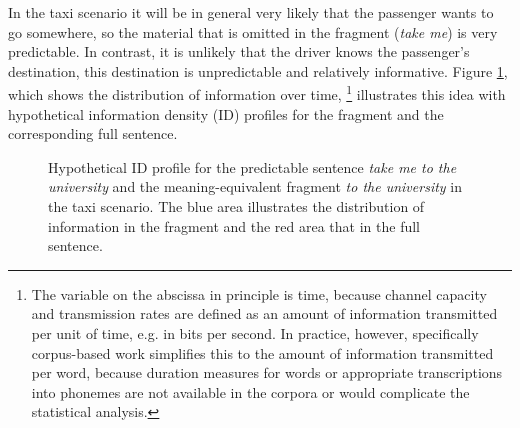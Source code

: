 In the taxi scenario it will be in general very likely that the passenger wants to go somewhere, so the material that is omitted in the fragment (\textit{take me}) is very predictable. In contrast, it is unlikely that the driver knows the passenger's destination, this destination is unpredictable and relatively informative. Figure \ref{fig:fragments-uid-predictable}, which shows the distribution of information over time,%
%
\footnote{The variable on the abscissa in principle is time, because channel capacity and transmission rates are defined as an amount of information transmitted per unit of time, e.g. in bits per second. In practice, however, specifically corpus-based work \citep[see e.g.][]{levy.jaeger2007, frank.jaeger2008, jaeger2010} simplifies this to the amount of information transmitted per word, because duration measures for words or appropriate transcriptions into phonemes are not available in the corpora or would complicate the statistical analysis.}\afterfn%
%
illustrates this idea with hypothetical information density (ID) profiles for the fragment and the corresponding full sentence. 

\begin{figure}
\begin{minipage}{\textwidth}
\end{minipage}
 \caption{Hypothetical ID profile for the predictable sentence \textit{take me to the university} and the meaning-equivalent fragment \textit{to the university} in the taxi scenario. The blue area illustrates the distribution of information in the fragment and the red area that in the full sentence.\label{fig:fragments-uid-predictable}}
\end{figure}

